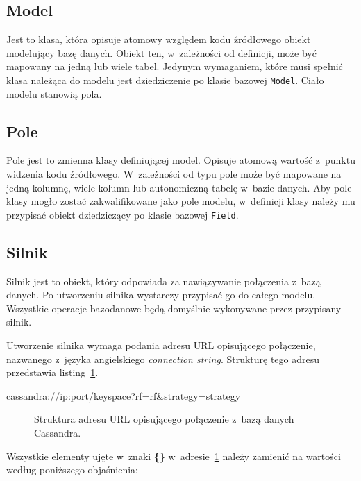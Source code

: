 \subsection{Model}

Jest to klasa, która opisuje atomowy względem kodu źródłowego obiekt modelujący bazę danych. Obiekt ten, w~zależności od definicji, może być mapowany na jedną lub wiele tabel. Jedynym wymaganiem, które musi spełnić klasa należąca do modelu jest dziedziczenie po klasie bazowej \verb+Model+. Ciało modelu stanowią pola.

\subsection{Pole}

Pole jest to zmienna klasy definiującej model. Opisuje atomową wartość z~punktu widzenia kodu źródłowego. W~zależności od typu pole może być mapowane na jedną kolumnę, wiele kolumn lub autonomiczną tabelę w~bazie danych. Aby pole klasy mogło zostać zakwalifikowane jako pole modelu, w~definicji klasy należy mu przypisać obiekt dziedziczący po klasie bazowej \verb+Field+.

\subsection{Silnik}

Silnik jest to obiekt, który odpowiada za nawiązywanie połączenia z~bazą danych. Po utworzeniu silnika wystarczy przypisać go do całego modelu. Wszystkie operacje bazodanowe będą domyślnie wykonywane przez przypisany silnik. 

Utworzenie silnika wymaga podania adresu URL opisującego połączenie, nazwanego z~języka angielskiego \emph{connection string}. Strukturę tego adresu przedstawia listing~\ref{lst:connection_string}.

\begin{verbbox}[\footnotesize]
	cassandra://{ip}:{port}/{keyspace}?rf={rf}&strategy={strategy}
\end{verbbox}

\begin{figure}[ht!]
	\centering
	\theverbbox
	\caption{Struktura adresu URL opisującego połączenie z~bazą danych Cassandra.}
	\label{lst:connection_string}
\end{figure}

Wszystkie elementy ujęte w~znaki \textbf{\{\}} w~adresie~\ref{lst:connection_string} należy zamienić na wartości według poniższego objaśnienia:

